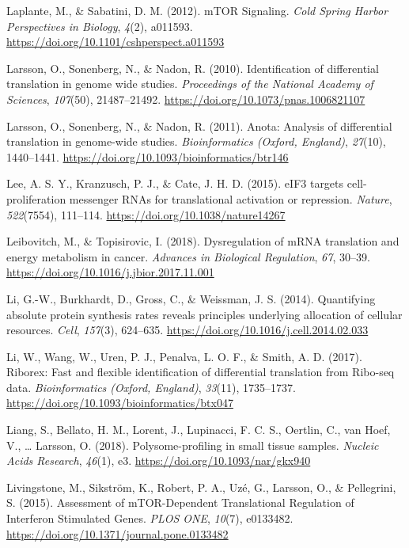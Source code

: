 \documentclass[12pt,openany]{book}
\begin{document}
\hypertarget{ref-Laplante2012}{}
Laplante, M., \& Sabatini, D. M. (2012). mTOR Signaling. \emph{Cold
Spring Harbor Perspectives in Biology}, \emph{4}(2), a011593.
\url{https://doi.org/10.1101/cshperspect.a011593}

\hypertarget{ref-Larsson2010}{}
Larsson, O., Sonenberg, N., \& Nadon, R. (2010). Identification of
differential translation in genome wide studies. \emph{Proceedings of
the National Academy of Sciences}, \emph{107}(50), 21487--21492.
\url{https://doi.org/10.1073/pnas.1006821107}

\hypertarget{ref-Larsson2011}{}
Larsson, O., Sonenberg, N., \& Nadon, R. (2011). Anota: Analysis of
differential translation in genome-wide studies. \emph{Bioinformatics
(Oxford, England)}, \emph{27}(10), 1440--1441.
\url{https://doi.org/10.1093/bioinformatics/btr146}

\hypertarget{ref-Lee2015}{}
Lee, A. S. Y., Kranzusch, P. J., \& Cate, J. H. D. (2015). eIF3 targets
cell-proliferation messenger RNAs for translational activation or
repression. \emph{Nature}, \emph{522}(7554), 111--114.
\url{https://doi.org/10.1038/nature14267}

\hypertarget{ref-Leibovitch2018}{}
Leibovitch, M., \& Topisirovic, I. (2018). Dysregulation of mRNA
translation and energy metabolism in cancer. \emph{Advances in
Biological Regulation}, \emph{67}, 30--39.
\url{https://doi.org/10.1016/j.jbior.2017.11.001}

\hypertarget{ref-Li2014}{}
Li, G.-W., Burkhardt, D., Gross, C., \& Weissman, J. S. (2014).
Quantifying absolute protein synthesis rates reveals principles
underlying allocation of cellular resources. \emph{Cell}, \emph{157}(3),
624--635. \url{https://doi.org/10.1016/j.cell.2014.02.033}

\hypertarget{ref-Li2017}{}
Li, W., Wang, W., Uren, P. J., Penalva, L. O. F., \& Smith, A. D.
(2017). Riborex: Fast and flexible identification of differential
translation from Ribo-seq data. \emph{Bioinformatics (Oxford, England)},
\emph{33}(11), 1735--1737.
\url{https://doi.org/10.1093/bioinformatics/btx047}

\hypertarget{ref-Liang2018}{}
Liang, S., Bellato, H. M., Lorent, J., Lupinacci, F. C. S., Oertlin, C.,
van Hoef, V., \ldots{} Larsson, O. (2018). Polysome-profiling in small
tissue samples. \emph{Nucleic Acids Research}, \emph{46}(1), e3.
\url{https://doi.org/10.1093/nar/gkx940}

\hypertarget{ref-Livingstone2015}{}
Livingstone, M., Sikström, K., Robert, P. A., Uzé, G., Larsson, O., \&
Pellegrini, S. (2015). Assessment of mTOR-Dependent Translational
Regulation of Interferon Stimulated Genes. \emph{PLOS ONE},
\emph{10}(7), e0133482.
\url{https://doi.org/10.1371/journal.pone.0133482}
\end{document}
